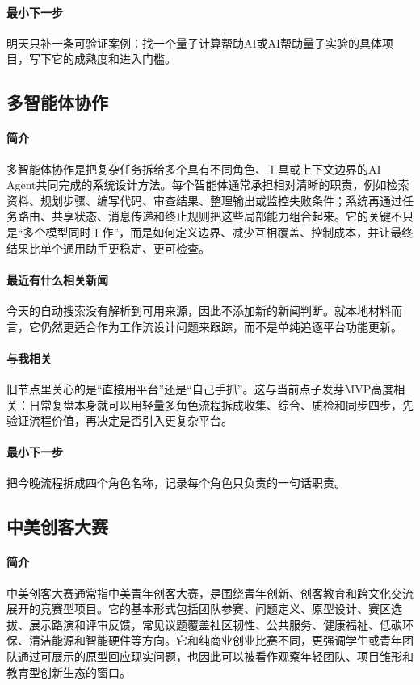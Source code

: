 \documentclass[UTF8,zihao=-4]{ctexart}
\begin{document}
\paragraph{最小下一步} 明天只补一条可验证案例：找一个量子计算帮助AI或AI帮助量子实验的具体项目，写下它的成熟度和进入门槛。
\subsection*{多智能体协作}
\paragraph{简介} 多智能体协作是把复杂任务拆给多个具有不同角色、工具或上下文边界的AI Agent共同完成的系统设计方法。每个智能体通常承担相对清晰的职责，例如检索资料、规划步骤、编写代码、审查结果、整理输出或监控失败条件；系统再通过任务路由、共享状态、消息传递和终止规则把这些局部能力组合起来。它的关键不只是“多个模型同时工作”，而是如何定义边界、减少互相覆盖、控制成本，并让最终结果比单个通用助手更稳定、更可检查。
\paragraph{最近有什么相关新闻} 今天的自动搜索没有解析到可用来源，因此不添加新的新闻判断。就本地材料而言，它仍然更适合作为工作流设计问题来跟踪，而不是单纯追逐平台功能更新。
\paragraph{与我相关} 旧节点里关心的是“直接用平台”还是“自己手抓”。这与当前点子发芽MVP高度相关：日常复盘本身就可以用轻量多角色流程拆成收集、综合、质检和同步四步，先验证流程价值，再决定是否引入更复杂平台。
\paragraph{最小下一步} 把今晚流程拆成四个角色名称，记录每个角色只负责的一句话职责。
\subsection*{中美创客大赛}
\paragraph{简介} 中美创客大赛通常指中美青年创客大赛，是围绕青年创新、创客教育和跨文化交流展开的竞赛型项目。它的基本形式包括团队参赛、问题定义、原型设计、赛区选拔、展示路演和评审反馈，常见议题覆盖社区韧性、公共服务、健康福祉、低碳环保、清洁能源和智能硬件等方向。它和纯商业创业比赛不同，更强调学生或青年团队通过可展示的原型回应现实问题，也因此可以被看作观察年轻团队、项目雏形和教育型创新生态的窗口。
\end{document}
